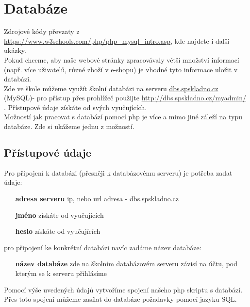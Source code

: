 \section{Databáze}
Zdrojové kódy převzaty z \url{https://www.w3schools.com/php/php_mysql_intro.asp}, kde najdete i další ukázky.\\
Pokud chceme, aby naše webové stránky zpracovávaly větší množství informací (např. více uživatelů, různé zboží v e-shopu) je vhodné tyto informace uložit v databázi.\\
Zde ve škole můžeme využít školní databázi na serveru \url{dbs.spskladno.cz} (MySQL)- pro přístup přes prohlížeč použijte \url{http://dbs.spskladno.cz/myadmin/} . Přístupové údaje získáte od svých vyučujících.\\
Možností jak pracovat s databází pomocí php je více a mimo jiné záleží na typu databáze. Zde si ukážeme jednu z možností.\\

\subsection{Přístupové údaje}
Pro připojení k databázi (přesněji k databázovému serveru) je potřeba zadat údaje:
\begin{enumerate}
\item[\textbf{adresa serveru}] ip, nebo url adresa - dbs.spskladno.cz
\item[\textbf{jméno}] získáte od vyučujících
\item[\textbf{heslo}] získáte od vyučujících
\end{enumerate}
pro připojení ke konkrétní databázi navíc zadáme název databáze:
\begin{enumerate} \setcounter{enumi}{4}
\item[\textbf{název databáze}] zde na školním databázovém serveru závisí na účtu, pod kterým se k serveru přihlásíme
\end{enumerate}

Pomocí výše uvedených údajů vytvoříme spojení našeho php skriptu s databází. Přes toto spojení můžeme zasílat do databáze požadavky pomocí jazyku SQL.\\

